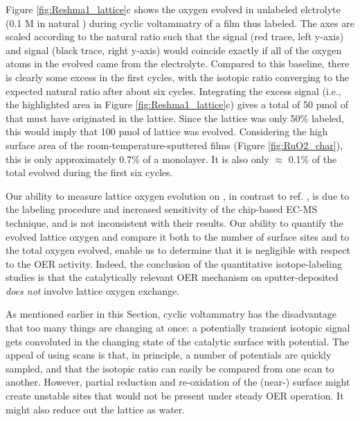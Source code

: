 Figure \ref{fig:Reshma1_lattice}c shows the oxygen evolved in unlabeled elctrolyte (0.1 M  in natural ) during cyclic voltammatry of a film thus labeled. The axes are scaled according to the natural ratio such that the  signal (red trace, left y-axis) and  signal (black trace, right y-axis) would coincide exactly if all of the oxygen atoms in the evolved  came from the electrolyte. Compared to this baseline, there is clearly some excess  in the first cycles, with the isotopic ratio converging to the expected natural ratio after about six cycles. Integrating the excess  signal (i.e., the highlighted area in Figure \ref{fig:Reshma1_lattice}c) gives a total of 50 pmol of  that must have originated in the lattice. Since the lattice was only 50\% labeled, this would imply that 100 pmol of lattice  was evolved. Considering the high surface area of the room-temperature-sputtered films (Figure \ref{fig:RuO2_char}), this is only approximately 0.7\% of a monolayer. It is also only $\approx$ 0.1\% of the total  evolved during the first six cycles. 

Our ability to measure lattice oxygen evolution on , in contrast to ref. \cite{Stoerzinger2017}, is due to the labeling procedure and increased sensitivity of the chip-based EC-MS technique, and is not inconsistent with their results. Our ability to quantify the evolved lattice oxygen and compare it both to the number of surface sites and to the total oxygen evolved, enable us to determine that it is negligible with respect to the OER activity. Indeed, the conclusion of the quantitative isotope-labeling studies is that the catalytically relevant OER mechanism on sputter-deposited  \textit{does not} involve lattice oxygen exchange.

As mentioned earlier in this Section, cyclic voltammatry has the disadvantage that too many things are changing at once: a potentially transient isotopic signal gets convoluted in the changing state of the catalytic surface with potential. The appeal of using scans is that, in principle, a number of potentials are quickly sampled\cite{Macounova2009}, and that the isotopic ratio can easily be compared from one scan to another\cite{Fierro2007}. However, partial reduction and re-oxidation of the (near-) surface might create unstable sites that would not be present under steady OER operation. It might also reduce out the lattice  as water. 

